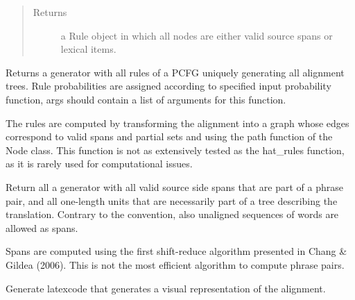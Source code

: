 \documentclass[letterpaper,10pt,english]{sphinxmanual}
\begin{document}
\begin{fulllineitems}
\begin{fulllineitems}
\begin{quote}
\begin{description}
\item[{Returns}] \leavevmode
a Rule object in which all nodes are either valid
source spans or lexical items.

\end{description}\end{quote}

\end{fulllineitems}


\begin{fulllineitems}
\label{alignments:alignments.Alignments.rules}
Returns a generator with all rules of a PCFG
uniquely generating all alignment trees. Rule
probabilities are assigned according to specified
input probability function, args should contain a list
of arguments for this function.

The rules are computed by transforming the alignment into
a graph whose edges correspond to valid spans and partial
sets and using the path function of the Node class.
This function is not as extensively tested as the hat\_rules function,
as it is rarely used for computational issues.

\end{fulllineitems}


\begin{fulllineitems}
\label{alignments:alignments.Alignments.spans}
Return all a generator with all valid source side 
spans that are part of a phrase pair, and all one-length
units that are necessarily part of a tree describing the
translation.
Contrary to the convention, also unaligned sequences
of words are allowed as spans.

Spans are computed using the first shift-reduce algorithm 
presented in Chang \& Gildea (2006). This is not the most
efficient algorithm to compute phrase pairs.

\end{fulllineitems}


\begin{fulllineitems}
\label{alignments:alignments.Alignments.texstring}
Generate latexcode that generates a visual representation
of the alignment.

\end{fulllineitems}


\end{fulllineitems}
\end{document}
